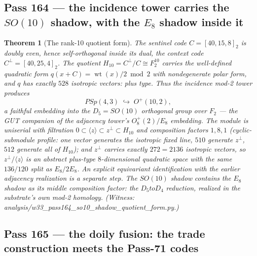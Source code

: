 \documentclass[12pt,a4paper]{article}
\def\mathbb#1{#1}%
\def\mathrm#1{#1}%
\def\mathbf#1{#1}%
\def\texttt#1{#1}%
\def\cdot{ }%
\def\to{ to }%
\newtheorem{theorem}{Theorem}[section]
\theoremstyle{definition}
\newcommand{\PSp}{\mathrm{PSp}}
\begin{document}
\subsection{Pass 164 --- the incidence tower carries the $\mathrm{SO}(10)$
shadow, with the $E_8$ shadow inside it}
\label{ssec:pass164}

\begin{theorem}[The rank-10 quotient form]
\label{thm:so10-shadow}
The sentinel code $C=[40,15,8]_2$ is doubly even, hence self-orthogonal
inside its dual, the context code $C^{\perp}=[40,25,4]_2$. The quotient
$H_{10}=C^{\perp}/C\cong\mathbb F_2^{10}$ carries the well-defined
quadratic form $q(x{+}C)=\operatorname{wt}(x)/2\bmod2$ with nondegenerate
polar form, and $q$ has exactly $\mathbf{528}$ isotropic vectors:
\emph{plus type}. Thus the incidence mod-2 tower produces
\[
  \PSp(4,3)\;\hookrightarrow\;O^{+}(10,2),
\]
a faithful embedding into the $D_5=\mathrm{SO}(10)$ orthogonal group over
$\mathbb F_2$ --- the GUT companion of the adjacency tower's
$O_8^{+}(2)/E_8$ embedding. The module is uniserial with filtration
$0\subset\langle z\rangle\subset z^{\perp}\subset H_{10}$ and composition
factors $1,8,1$ (cyclic-submodule profile: one vector generates the
isotropic fixed line, $510$ generate $z^{\perp}$, $512$ generate all of
$H_{10}$); and $z^{\perp}$ carries exactly $272=2\cdot136$ isotropic
vectors, so $z^{\perp}/\langle z\rangle$ is an abstract plus-type
$8$-dimensional quadratic space with the same $136/120$ split as
$E_8/2E_8$.  An explicit equivariant identification with the earlier
adjacency realization is a separate step. \emph{The
$\mathrm{SO}(10)$ shadow contains the $E_8$ shadow as its middle
composition factor: the $D_5\to D_4$ reduction, realized in the substrate's
own mod-2 homology.} (Witness:
\texttt{analysis/w33\_pass164\_so10\_shadow\_quotient\_form.py}.)
\end{theorem}

\subsection{Pass 165 --- the doily fusion: the trade construction meets the
Pass-71 codes}
\label{ssec:pass165}
\end{document}
